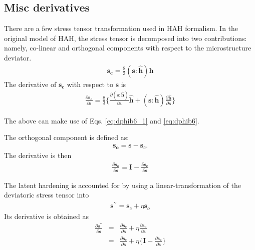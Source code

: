\documentclass[12pt]{amsart}
\begin{document}
\subsection{Misc derivatives}
\label{sec:misc}


There are a few stress tensor transformation used in HAH formalism.
In the original model of HAH, the stress tensor is decomposed into two contributions: namely, co-linear and orthogonal components with respect to the microstructure deviator.
\begin{eqnarray}
  \label{eq:decomp1}
  \mathbf{s_c} = \frac{8}{3} (\mathbf{s}:\hat{\mathbf{h}}) \mathbf{h}
\end{eqnarray}
The derivative of $\mathbf{s_c}$ with respect to $\mathbf{s}$ is
\begin{eqnarray}
  \label{eq:decomp2}
  \frac{\partial\mathbf{s_c}}{\partial\mathbf{s}} = \frac{8}{3}\bigg\{ \frac{\partial(\mathbf{s}:\hat{\mathbf{h}})}{\partial\mathbf{s}} \hat{\mathbf{h}}+ (\mathbf{s}:\hat{\mathbf{h}}) \frac{\partial\hat{\mathbf{h}}}{\partial\mathbf{s}}  \bigg\}
\end{eqnarray}

The above can make use of Eqs. \ref{eq:dphib6_1} and \ref{eq:dphib6}.

The orthogonal component is defined as:
\begin{eqnarray}
  \label{eq:decomp3}
  \mathbf{s_o} = \mathbf{s} - \mathbf{s}_c.
\end{eqnarray}
The derivative is then
\begin{eqnarray}
  \label{eq:decomp4}
  \frac{\partial\mathbf{s_o}}{\partial\mathbf{s}} = \mathbf{I} -   \frac{\partial\mathbf{s_c}}{\partial\mathbf{s}}
\end{eqnarray}


The latent hardening is accounted for by using a linear-transformation of the deviatoric stress tensor into
\begin{eqnarray}
  \label{eq:latent_decompose1}
  \mathbf{s}^{\prime\prime}=\mathbf{s}_c+\eta \mathbf{s}_o
\end{eqnarray}
Its derivative is obtained as
\begin{eqnarray}
  \label{eq:latent_decompose2}
  \frac{\partial\mathbf{s}^{\prime\prime}}{\partial\mathbf{s}} &=&\frac{\partial\mathbf{s}_c}{\partial\mathbf{s}} + \eta \frac{\partial\mathbf{s}_o}{\partial\mathbf{s}}\\
  &=&\frac{\partial\mathbf{s}_c}{\partial\mathbf{s}} + \eta \Big\{\mathbf{I} -   \frac{\partial\mathbf{s_c}}{\partial\mathbf{s}}\Big\}
\end{eqnarray}
\end{document}
